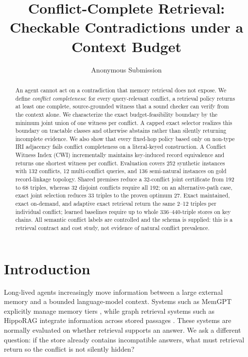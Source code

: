 \documentclass[letterpaper]{article} %
\title{Conflict-Complete Retrieval: Checkable Contradictions under a Context Budget}
\author{Anonymous Submission}
\newcommand{\cwi}{\textsc{CWI}}
\begin{document}
\maketitle

\begin{abstract}
An agent cannot act on a contradiction that memory retrieval does not expose.
We define \emph{conflict completeness}: for every query-relevant conflict, a
retrieval policy returns at least one complete, source-grounded witness that a
sound checker can verify from the context alone.  We characterize the exact
budget-feasibility boundary by the minimum joint union of one witness per
conflict.  A capped exact selector realizes this boundary on tractable
classes and otherwise abstains rather than silently returning incomplete
evidence.  We also show
that every fixed-hop policy based only on non-type IRI adjacency fails conflict
completeness on a literal-keyed construction.  A Conflict Witness Index
(\cwi) incrementally maintains key-induced record equivalence and returns one
shortest witness per conflict.  Evaluation covers 252 synthetic instances
with 132 conflicts, 12 multi-conflict queries, and 136 semi-natural instances
on gold record-linkage topology.  Shared premises reduce a
32-conflict joint certificate from 192 to 68 triples, whereas 32 disjoint
conflicts require all 192; on an alternative-path case, exact joint selection
reduces 33 triples to the proven optimum 27.  Exact maintained, exact on-demand, and adaptive
exact retrieval return the same 2--12 triples per individual conflict; learned
baselines require up to whole 336--440-triple stores on key chains.  All
semantic conflict labels are controlled and the schema is supplied: this is a
retrieval contract and cost study, not evidence of natural conflict prevalence.
\end{abstract}

\section{Introduction}

Long-lived agents increasingly move information between a large external
memory and a bounded language-model context.  Systems such as MemGPT explicitly
manage memory tiers \citep{memgpt2023}, while graph retrieval systems such as
HippoRAG integrate information across stored passages \citep{hipporag2024}.
These systems are normally evaluated on whether retrieval supports an answer.
We ask a different question: if the store already contains incompatible
answers, what must retrieval return so the conflict is not silently hidden?
\end{document}
